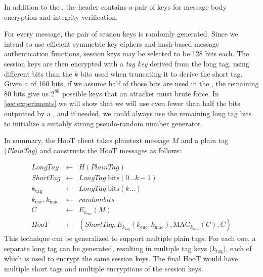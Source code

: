 %
In addition to the , the header contains a pair of keys
for message body encryption and integrity verification.

For every message, the pair of session keys is randomly generated. Since we intend
to use efficient symmetric key ciphers and hash-based message authentication
functions, session keys may be selected to be 128 bits each. The session keys
are then encrypted with a {\em tag key} derived from the long tag, using
different bits than the $k$ bits used when truncating it to derive the
short tag. Given a  of 160 bits, if we assume half of those bits
are used in the , the remaining 80 bits give
us $2^80$ possible keys that an attacker must brute force. In \ref{sec:experiments}
we will show that we will use even fewer than half the bits outputted by a , and if
needed, we could always use the remaining long tag bits
to initialize a suitably strong pseudo-random number generator.

In summary, the HooT client takes plaintext message $M$ and a plain tag
({\em PlainTag}) and constructs the HooT messages as follows:
%

\begin{eqnarray*}
\mathit{LongTag} & \leftarrow & H(\mathit{PlainTag}) \\
\mathit{ShortTag} & \leftarrow & \mathit{LongTag}.\mathrm{bits}(0 \ldots k-1) \\
k_{\mathrm{tag}} & \leftarrow & \mathit{LongTag}.\mathrm{bits}(k \ldots) \\
k_{\mathrm{enc}}, k_{\mathrm{mac}} & \leftarrow & \mathit{random bits} \\
C & \leftarrow & E_{k_{\mathrm{enc}}}(M) \\
\mathit{HooT}  & \leftarrow &  \left(\mathit{ShortTag}, E_{k_{\mathrm{tag}}} \left(k_{\mathrm{enc}}, k_{\mathrm{mac}}\right), \mathrm{MAC}_{k_{\mathrm{mac}}}(C), C\right)
\end{eqnarray*}
%
This technique can be generalized to support multiple plain tags. For
each one, a separate long tag can be generated, resulting in multiple
tag keys ($k_\mathrm{tag}$), each of which is used to encrypt the same
session keys. The final HooT would have multiple short tags and multiple
encryptions of the session keys.

